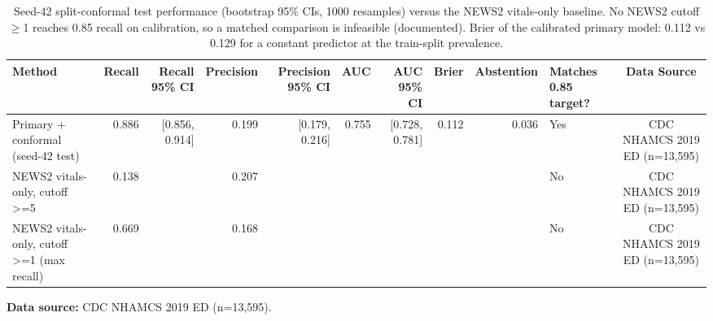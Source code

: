 \begin{table}[t]
\centering
\caption{Seed-42 split-conformal test performance (bootstrap 95\% CIs, 1000 resamples) versus the NEWS2 vitals-only baseline. No NEWS2 cutoff $\geq$1 reaches 0.85 recall on calibration, so a matched comparison is infeasible (documented). Brier of the calibrated primary model: 0.112 vs 0.129 for a constant predictor at the train-split prevalence.}
\label{tab:severity_baseline}
\begin{tabular}{lrrrrrrrrlc}
\toprule
Method & Recall & Recall 95\% CI & Precision & Precision 95\% CI & AUC & AUC 95\% CI & Brier & Abstention & Matches 0.85 target? & Data Source \\
\midrule
Primary + conformal (seed-42 test) & 0.886 & [0.856, 0.914] & 0.199 & [0.179, 0.216] & 0.755 & [0.728, 0.781] & 0.112 & 0.036 & Yes & CDC NHAMCS 2019 ED (n=13,595) \\
NEWS2 vitals-only, cutoff >=5 & 0.138 &  & 0.207 &  &  &  &  &  & No & CDC NHAMCS 2019 ED (n=13,595) \\
NEWS2 vitals-only, cutoff >=1 (max recall) & 0.669 &  & 0.168 &  &  &  &  &  & No & CDC NHAMCS 2019 ED (n=13,595) \\
\bottomrule
\end{tabular}
\par\vspace{2pt}\raggedright\footnotesize \textbf{Data source:} CDC NHAMCS 2019 ED (n=13,595).
\end{table}
